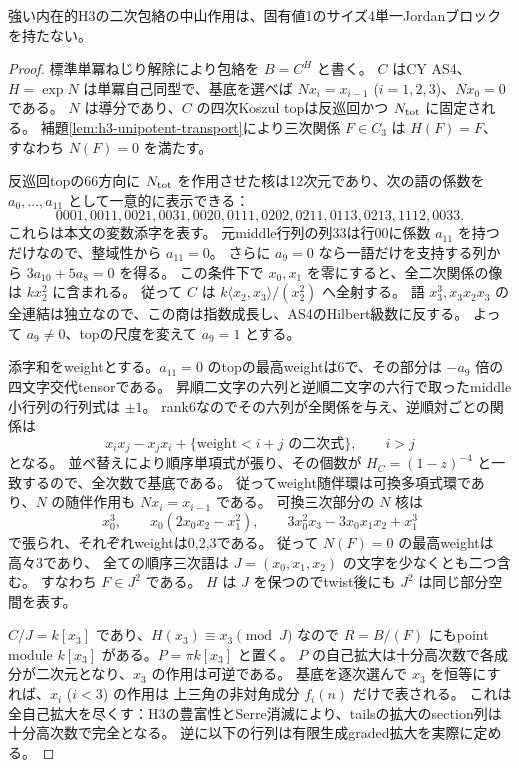 \begin{theorem}\label{thm:cubic-principal-unipotent-empty}
強い内在的H3の二次包絡の中山作用は、固有値1のサイズ4単一Jordanブロックを持たない。
\end{theorem}
\begin{proof}
標準単冪ねじり解除により包絡を $B=C^H$ と書く。
$C$ はCY AS4、$H=\exp N$ は単冪自己同型で、基底を選べば
$Nx_i=x_{i-1}$ ($i=1,2,3$)、$Nx_0=0$ である。
$N$ は導分であり、$C$ の四次Koszul topは反巡回かつ $N_{\rm tot}$ に固定される。
補題\ref{lem:h3-unipotent-transport}により三次関係 $F\in C_3$ は $H(F)=F$、
すなわち $N(F)=0$ を満たす。

反巡回topの66方向に $N_{\rm tot}$ を作用させた核は12次元であり、次の語の係数を
$a_0,\ldots,a_{11}$ として一意的に表示できる：
\[
0001,0011,0021,0031,0020,0111,0202,0211,0113,0213,1112,0033.
\]
これらは本文の変数添字を表す。
元middle行列の列33は行00に係数 $a_{11}$ を持つだけなので、整域性から $a_{11}=0$。
さらに $a_9=0$ なら一語だけを支持する列から $3a_{10}+5a_8=0$ を得る。
この条件下で $x_0,x_1$ を零にすると、全二次関係の像は $kx_2^2$ に含まれる。
従って $C$ は $k\langle x_2,x_3\rangle/(x_2^2)$ へ全射する。
語 $x_3^3,x_3x_2x_3$ の全連結は独立なので、この商は指数成長し、AS4のHilbert級数に反する。
よって $a_9\ne0$、topの尺度を変えて $a_9=1$ とする。

添字和をweightとする。$a_{11}=0$ のtopの最高weightは6で、その部分は
$-a_9$ 倍の四文字交代tensorである。
昇順二文字の六列と逆順二文字の六行で取ったmiddle小行列の行列式は $\pm1$。
rank6なのでその六列が全関係を与え、逆順対ごとの関係は
\[
 x_i x_j-x_jx_i+\{\text{weight}<i+j\text{ の二次式}\},\qquad i>j
\]
となる。
並べ替えにより順序単項式が張り、その個数が $H_C=(1-z)^{-4}$ と一致するので、全次数で基底である。
従ってweight随伴環は可換多項式環であり、$N$ の随伴作用も $Nx_i=x_{i-1}$ である。
可換三次部分の $N$ 核は
\[
 x_0^3,\qquad x_0(2x_0x_2-x_1^2),\qquad
 3x_0^2x_3-3x_0x_1x_2+x_1^3
\]
で張られ、それぞれweightは0,2,3である。
従って $N(F)=0$ の最高weightは高々3であり、
全ての順序三次語は $J=(x_0,x_1,x_2)$ の文字を少なくとも二つ含む。
すなわち $F\in J^2$ である。
$H$ は $J$ を保つのでtwist後にも $J^2$ は同じ部分空間を表す。

$C/J=k[x_3]$ であり、$H(x_3)\equiv x_3\pmod J$ なので
$R=B/(F)$ にもpoint module $k[x_3]$ がある。$P=\pi k[x_3]$ と置く。
$P$ の自己拡大は十分高次数で各成分が二次元となり、$x_3$ の作用は可逆である。
基底を逐次選んで $x_3$ を恒等にすれば、$x_i$ ($i<3$) の作用は
上三角の非対角成分 $f_i(n)$ だけで表される。
これは全自己拡大を尽くす：H3の豊富性とSerre消滅により、tailsの拡大のsection列は十分高次数で完全となる。
逆に以下の行列は有限生成graded拡大を実際に定める。


\end{proof}
